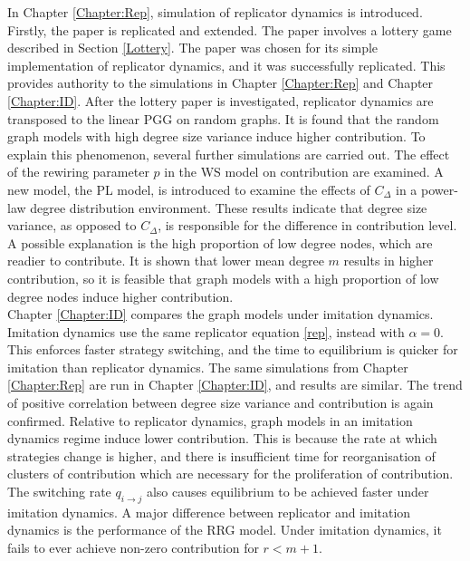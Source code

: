 In Chapter \ref{Chapter:Rep}, simulation of replicator dynamics is introduced. Firstly, the paper \cite{RN30} is replicated and extended. The paper involves a lottery game described in Section \ref{Lottery}. The paper was chosen for its simple implementation of replicator dynamics, and it was successfully replicated. This provides authority to the simulations in Chapter \ref{Chapter:Rep} and Chapter \ref{Chapter:ID}. After the lottery paper is investigated, replicator dynamics are transposed to the linear PGG on random graphs. It is found that the random graph models with high degree size variance induce higher contribution. To explain this phenomenon, several further simulations are carried out. The effect of the rewiring parameter $p$ in the WS model on contribution are examined. A new model, the PL model, is introduced to examine the effects of $C_\Delta$ in a power-law degree distribution environment. These results indicate that degree size variance, as opposed to $C_\Delta$, is responsible for the difference in contribution level. A possible explanation is the high proportion of low degree nodes, which are readier to contribute. It is shown that lower mean degree $m$ results in higher contribution, so it is feasible that graph models with a high proportion of low degree nodes induce higher contribution.  \\

Chapter \ref{Chapter:ID} compares the graph models under imitation dynamics. Imitation dynamics use the same replicator equation \eqref{rep}, instead with $\alpha=0$. This enforces faster strategy switching, and the time to equilibrium is quicker for imitation than replicator dynamics. The same simulations from Chapter \ref{Chapter:Rep} are run in Chapter \ref{Chapter:ID}, and results are similar. The trend of positive correlation between degree size variance and contribution is again confirmed. Relative to replicator dynamics, graph models in an imitation dynamics regime induce lower contribution. This is because the rate at which strategies change is higher, and there is insufficient time for reorganisation of clusters of contribution which are necessary for the proliferation of contribution. The switching rate $q_{i \to j}$ also causes equilibrium to be achieved faster under imitation dynamics. A major difference between replicator and imitation dynamics is the performance of the RRG model. Under imitation dynamics, it fails to ever achieve non-zero contribution for $r<m+1$. 


 
